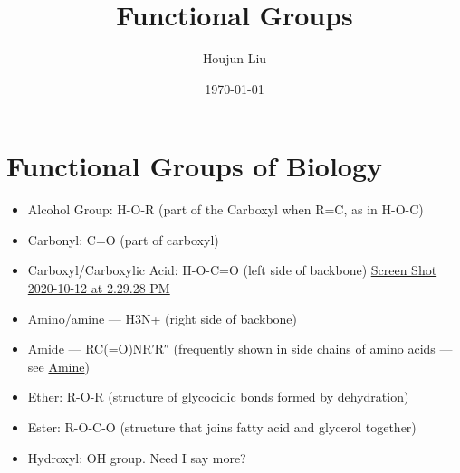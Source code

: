 \documentclass[letterpaper]{article}
\author{Houjun Liu}
\date{\today}
\title{Functional Groups}
\renewcommand\maketitle{}
\begin{document}
\maketitle


\section{Functional Groups of Biology}
\label{sec:org851063d}
\begin{itemize}
\item Alcohol Group: H-O-R (part of the Carboxyl when R=C, as in H-O-C)
\item Carbonyl: C=O (part of carboxyl)
\item Carboxyl/Carboxylic Acid: H-O-C=O (left side of backbone)
\href{Screen Shot 2020-10-12 at 2.29.28 PM.org}{Screen Shot
2020-10-12 at 2.29.28 PM}
\item Amino/amine --- H3N+ (right side of backbone)
\item Amide --- RC(=O)NR′R″ (frequently shown in side chains of amino acids
--- see
\href{https://en.wikipedia.org/wiki/Amide\#/media/File:Amide-general.png}{Amine})
\item Ether: R-O-R (structure of glycocidic bonds formed by dehydration)
\item Ester: R-O-C-O (structure that joins fatty acid and glycerol together)
\item Hydroxyl: OH group. Need I say more?
\end{itemize}
\end{document}
